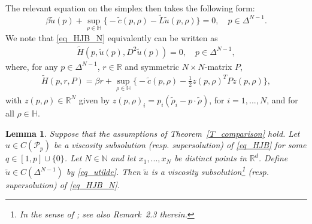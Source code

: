 \documentclass{article}
\newtheorem{lemma}[theorem]{Lemma}
\theoremstyle{definition}
\numberwithin{equation}{section}
\numberwithin{theorem}{section}
\newcommand{\R}{\mathbb{R}}
\newcommand{\Hb}{\mathbb{H}}
\newcommand{\Nb}{\mathbb{N}}
\newcommand{\Pc}{\mathcal{P}}
\begin{document}
The relevant equation on the simplex then takes the following form: 
\begin{equation}\label{eq_HJB_N}
\beta \tilde u(p) + \sup_{\rho\in\Hb}\big\{ - \tilde c(p,\rho) - \tilde L\tilde u(p,\rho)\big\} = 0,\quad p\in\Delta^{N-1}.
\end{equation} 
We note that \eqref{eq_HJB_N} equivalently can be written as 
\begin{align}\label{eq_HJB_N_H}
\tilde H\left(p,\tilde u(p),D^2\tilde u(p)\right)=0,\quad p\in\Delta^{N-1},
\end{align}
where, for any $p\in\Delta^{N-1}$, $r\in\R$ and symmetric $N\times N$-matrix $P$,
\begin{align*}
\tilde H(p,r,P)=\beta r+\sup_{\rho\in\Hb}\Big\{-\tilde c(p,\rho)-\frac12 z(p,\rho)^TPz(p,\rho)\Big\},
\end{align*}
with $z(p,\rho)\in\R^N$ given by $z(p,\rho)_i=p_i(\tilde\rho_i-p\cdot\tilde\rho)$, for $i=1,...,N$, and for all $\rho\in\Hb$.


\begin{lemma}\label{L_HJB_N}
Suppose that the assumptions of Theorem~\ref{T_comparison} hold.
Let $u\in C(\Pc_p)$ be a viscosity subsolution (resp. supersolution) of \eqref{eq_HJB} for some $q \in [1,p] \cup \{0\}$. Let $N\in\Nb$ and let $x_1,...,x_N$ be distinct points in ${\R^d}$. Define $\tilde u\in C(\Delta^{N-1})$ by \eqref{eq_utilde}. Then $\tilde u$ is a viscosity subsolution\footnote{In the sense of \cite[Definition~2.2]{crandall1992}; see also Remark~2.3 therein.} (resp. supersolution) of \eqref{eq_HJB_N}.
\end{lemma}
 
\end{document}
